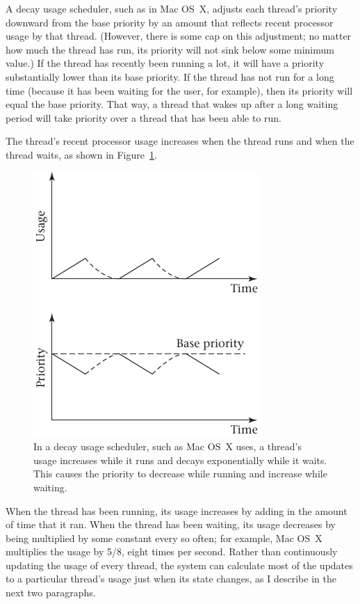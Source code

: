 A decay usage scheduler, such as in Mac OS~X, adjusts each thread's
priority downward from the base priority by an amount that reflects
recent processor usage by that thread.  (However, there is some cap on
this adjustment; no matter how much the thread has run, its priority
will not sink below some minimum value.)  If the thread has recently
been running a lot, it will have a priority substantially lower than
its base priority.  If the thread has not run for a long time (because
it has been waiting for the user, for example), then its priority will
equal the base priority.  That way, a thread that wakes up after a
long waiting period will take priority over a thread that has been
able to run.

The thread's recent processor usage increases when the thread runs
and  when the thread waits, as shown in
Figure~\ref{scan-3-4}.
\begin{figure}
\centerline{\includegraphics{hail_f0309}}
\caption{In a decay usage scheduler, such as Mac OS~X uses, a thread's
  usage increases while it runs and decays exponentially while it
  waits.  This causes the priority to decrease while running and
  increase while waiting.}
\label{scan-3-4}
\end{figure}
When the thread has been
running, its usage increases by adding in the amount of time that it
ran.  When the thread has been waiting, its usage decreases by being
multiplied by some constant every so often; for example, Mac OS~X
multiplies the usage by 5/8, eight times per second.
Rather than continuously updating the usage of every thread, the
system can calculate most of the updates to a particular thread's usage just when its state
changes, as I describe in the next two paragraphs.

